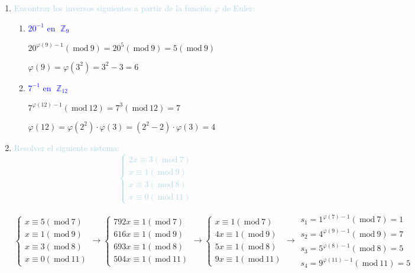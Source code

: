 \documentclass[12pt]{article}
\newcommand{\lb}[1]{\textcolor{lightblue}{#1}}
\newcommand{\db}[1]{\textcolor{blue}{#1}}
\DeclareMathOperator{\Z}{\mathbb{Z}}
\renewcommand{\mod}{~\mathrm{mod}~}
\begin{document}
\begin{enumerate}[label=\color{red}\textbf{\arabic*)}, leftmargin=*]
\begin{enumerate}[label=\color{red}\alph*)]
	\end{enumerate}
	\item \lb{Encontrar los inversos siguientes a partir de la función $\varphi$ de Euler:}
	\begin{enumerate}[label=\color{red}\alph*)]
		\item \db{$20^{-1}$ en $\Z_9$}
        
        $20^{\varphi(9)-1}(\mod 9)=20^5(\mod 9)=5(\mod 9)$
        
        $\varphi(9)=\varphi(3^2)=3^2-3=6$
		\item \db{$7^{-1}$ en $\Z_{12}$}
        
        $7^{\varphi(12)-1}(\mod12)=7^3(\mod12)=7$
        
        $\varphi(12)=\varphi(2^2)\cdot\varphi(3)=(2^2-2)\cdot\varphi(3)=4$
	\end{enumerate}
	\item \lb{Resolver el siguiente sistema:\[ \begin{cases}
			2x\equiv3(\mod 7)\\
			x\equiv 1(\mod9)\\
			x\equiv3(\mod 8)\\
			x\equiv0(\mod11)
		\end{cases} \]}
	
    $\begin{cases}
    			x\equiv5(\mod 7)\\
    			x\equiv 1(\mod9)\\
    			x\equiv3(\mod 8)\\
    			x\equiv0(\mod11)
    		\end{cases}\longrightarrow\begin{cases}
            			792x\equiv1(\mod 7)\\
            			616x\equiv 1(\mod9)\\
            			693x\equiv1(\mod 8)\\
            			504x\equiv1(\mod11)
            		\end{cases}\longrightarrow\begin{cases}
                    			x\equiv1(\mod 7)\\
                    			4x\equiv 1(\mod9)\\
                    			5x\equiv1(\mod 8)\\
                    			9x\equiv1(\mod11)
                    		\end{cases}\longrightarrow\begin{array}{l}
                            s_1=1^{\varphi(7)-1}(\mod 7)=1\\
                            s_2=4^{\varphi(9)-1}(\mod 9)=7\\
                            s_3=5^{\varphi(8)-1}(\mod8)=5\\
                            s_4=9^{\varphi(11)-1}(\mod11)=5
                            \end{array}
                    	$
                        

\end{enumerate}
\end{document}
